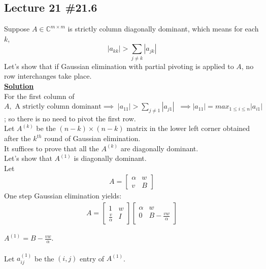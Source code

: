 \documentclass[11pt]{article}
\begin{document}
\subsection*{Lecture 21 \#21.6}
Suppose $A \in \mathbb{C}^{m \times m}$ is strictly column diagonally dominant, which means for each $k$,
\begin{equation*}
\left|a_{kk}\right|> \sum\limits_{j \ne k}{\left|{a_{jk}}\right|}
\end{equation*}
Let's show that if Gaussian elimination with partial pivoting is applied to $A$, no row interchanges take place.\\
\underline{\textbf{Solution}}\\
For the first column of $A, \text{  A strictly column dominant} \implies \;\left| a_{11}\right| > \sum \limits_{j \ne 1}{\left|{a_{j1}}\right|} \;\; \implies  \left| a_{11}\right| = max_{1 \leq i \leq n}
\left| a_{i1}\right|  $; so there is no need to pivot the first row.\\
Let $A^{(k)}$ be the $(n-k) \times (n-k)$ matrix in the lower left corner obtained after the $k^{th}$ round of  Gaussian elimination.\\
It suffices to prove that all the $A^{(k)}$ are diagonally dominant.\\
Let's show that $A^{(1)}$ is diagonally dominant.\\
Let 
\begin{align*}
A = 
\begin{bmatrix}
\alpha & w\\
v &  B
\end{bmatrix}
\end{align*}
One step Gaussian elimination yields:
\begin{align*}
A = 
\begin{bmatrix}
1 & w\\
\frac{v}{\alpha} &  I
\end{bmatrix}
\begin{bmatrix}
\alpha & w\\
0 &  B- \frac{vw}{\alpha}
\end{bmatrix}
\end{align*}

$A^{(1)} =  B- \frac{vw}{\alpha}$.\\\\
Let $a_{ij}^{(1)}$ be the $(i, j)$ entry of $A^{(1)}$.
\end{document}
